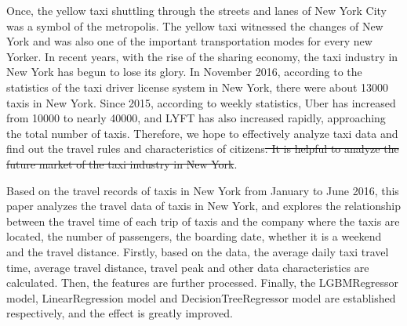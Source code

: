 \documentclass{amsart}
\providecommand{\DIFdel}[1]{{\protect\color{red}\sout{#1}}}                      %
\providecommand{\DIFdelbegin}{} %
\providecommand{\DIFdelend}{} %
\begin{document}







Once, the yellow taxi shuttling through the streets and lanes of New York City was a symbol of the metropolis. The yellow taxi witnessed the changes of New York and was also one of the important transportation modes for every new Yorker. In recent years, with the rise of the sharing economy, the taxi industry in New York has begun to lose its glory. In November 2016, according to the statistics of the taxi driver license system in New York, there were about 13000 taxis in New York. Since 2015, according to weekly statistics, Uber has increased from 10000 to nearly 40000, and LYFT has also increased rapidly, approaching the total number of taxis. Therefore, we hope to effectively analyze taxi data and find out the travel rules and characteristics of citizens\DIFdelbegin \DIFdel{. It is helpful to analyze the future market of the taxi industry in New York}\DIFdelend . 


Based on the travel records of taxis in New York from January to June 2016, this paper analyzes the travel data of taxis in New York, and explores the relationship between the travel time of each trip of taxis and the company where the taxis are located, the number of passengers, the boarding date, whether it is a weekend and the travel distance. Firstly, based on the data, the average daily taxi travel time, average travel distance, travel peak and other data characteristics are calculated. Then, the features are further processed. Finally, the LGBMRegressor model, LinearRegression model and DecisionTreeRegressor model are established respectively, and the effect is greatly improved.
\end{document}

